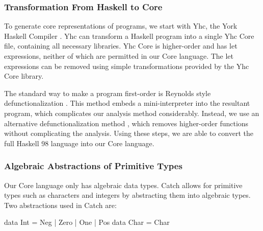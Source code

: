 \documentclass[preprint]{sigplanconf}
\begin{document}
\subsubsection{Transformation From Haskell to Core}
\label{sec:transform}

To generate core representations of programs, we start with Yhc, the York Haskell Compiler \citep{me:yhc_core}. Yhc can transform a Haskell program into a single Yhc Core file, containing all necessary libraries. Yhc Core is higher-order and has let expressions, neither of which are permitted in our Core language. The let expressions can be removed using simple transformations provided by the Yhc Core library.

The standard way to make a program first-order is Reynolds style defunctionalization \cite{reynolds:defunc}. This method embeds a mini-interpreter into the resultant program, which complicates our analysis method considerably. Instead, we use an alternative defunctionalization method \cite{me:firstify_icfp}, which removes higher-order functions without complicating the analysis. Using these steps, we are able to convert the full Haskell 98 language into our Core language.

\subsubsection{Algebraic Abstractions of Primitive Types}
\label{sec:abstraction}

\begin{comment}
Natural numbers are often encoded by Peano numerals, and this idea can easily be extended to integers:

\begin{code}
data Pos  = One | Succ Pos
data Int  = Minus Pos | Zero | Plus Pos
\end{code}

Although this abstraction of |Int| captures all the underlying detail of the number system, the underlying constraint systems discussed in \S\ref{sec:constraint} would be unable to distinguishing between any pair of numbers both greater than 2, or both less than -2.
\end{comment}

Our Core language only has algebraic data types. Catch allows for primitive types such as characters and integers by abstracting them into algebraic types. Two abstractions used in Catch are:

\begin{code}
data Int = Neg | Zero | One | Pos
data Char = Char
\end{code}
\end{document}

